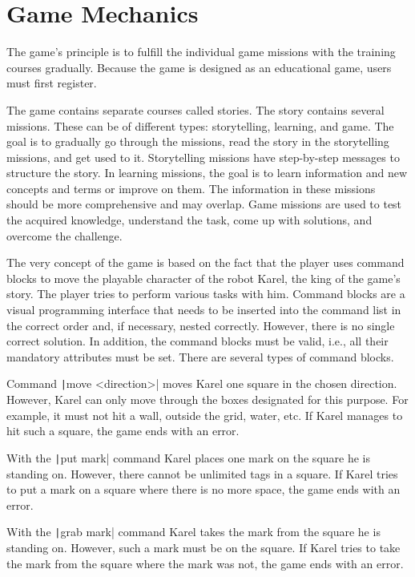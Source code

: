 \section{Game Mechanics}

The game's principle is to fulfill the individual game missions with the training courses gradually.
Because the game is designed as an educational game, users must first register.

The game contains separate courses called stories.
The story contains several missions.
These can be of different types: storytelling, learning, and game.
The goal is to gradually go through the missions, read the story in the storytelling missions, and get used to it.
Storytelling missions have step-by-step messages to structure the story.
In learning missions, the goal is to learn information and new concepts and terms or improve on them.
The information in these missions should be more comprehensive and may overlap.
Game missions are used to test the acquired knowledge, understand the task, come up with solutions, and overcome the challenge.

The very concept of the game is based on the fact that the player uses command blocks to move the playable character of the robot Karel, the king of the game's story.
The player tries to perform various tasks with him.
Command blocks are a visual programming interface that needs to be inserted into the command list in the correct order and, if necessary, nested correctly.
However, there is no single correct solution.
In addition, the command blocks must be valid, i.e., all their mandatory attributes must be set.
There are several types of command blocks.

Command \texttt|move <direction>| moves Karel one square in the chosen direction.
However, Karel can only move through the boxes designated for this purpose.
For example, it must not hit a wall, outside the grid, water, etc.
If Karel manages to hit such a square, the game ends with an error.

With the \texttt|put mark| command Karel places one mark on the square he is standing on.
However, there cannot be unlimited tags in a square.
If Karel tries to put a mark on a square where there is no more space, the game ends with an error.

With the \texttt|grab mark| command Karel takes the mark from the square he is standing on.
However, such a mark must be on the square.
If Karel tries to take the mark from the square where the mark was not, the game ends with an error.

